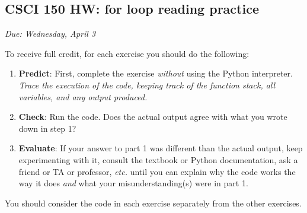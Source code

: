 \documentclass[]{article}
\date{}
\begin{document}
\subsection{CSCI 150 HW: for loop reading
practice}\label{csci-150-hw-for-loop-reading-practice}

\emph{Due: Wednesday, April 3}

To receive full credit, for each exercise you should do the following:

\begin{enumerate}
\def\labelenumi{\arabic{enumi}.}
\item
  \textbf{Predict}: First, complete the exercise \emph{without} using
  the Python interpreter. \emph{Trace the execution of the code, keeping
  track of the function stack, all variables, and any output produced.}
\item
  \textbf{Check}: Run the code. Does the actual output agree with what
  you wrote down in step 1?
\item
  \textbf{Evaluate}: If your answer to part 1 was different than the
  actual output, keep experimenting with it, consult the textbook or
  Python documentation, ask a friend or TA or professor, \emph{etc.}
  until you can explain why the code works the way it does \emph{and}
  what your misunderstanding(s) were in part 1.
\end{enumerate}

You should consider the code in each exercise separately from the other
exercises.
\end{document}
